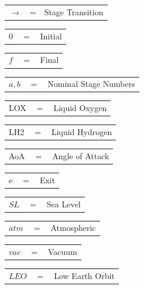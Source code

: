 \begin{tabular}{p{1.2cm}p{1cm}p{5cm}}
	$\rightarrow$ & = & Stage Transition\\
\end{tabular} 
\begin{tabular}{p{1.2cm}p{1cm}p{5cm}}
	$0$ & $=$ & Initial\\
\end{tabular} 
\begin{tabular}{p{1.2cm}p{1cm}p{5cm}}
	$f$ & $=$ & Final\\
\end{tabular} 
\begin{tabular}{p{1.2cm}p{1cm}p{5cm}}
	$a,b$ & $=$ & Nominal Stage Numbers\\
\end{tabular} 
\begin{tabular}{p{1.2cm}p{1cm}p{5cm}}
	LOX & $=$ & Liquid Oxygen\\
\end{tabular} 
\begin{tabular}{p{1.2cm}p{1cm}p{5cm}}
	LH2 & $=$ & Liquid Hydrogen\\
	
\end{tabular} 
\begin{tabular}{p{1.2cm}p{1cm}p{5cm}}
	AoA & $=$ & Angle of Attack\\
	
\end{tabular} 
\begin{tabular}{p{1.2cm}p{1cm}p{5cm}}
	e & $=$ & Exit\\
\end{tabular} 
\begin{tabular}{p{1.2cm}p{1cm}p{5cm}}
	$SL$ & $=$ & Sea Level\\
\end{tabular} 
\begin{tabular}{p{1.2cm}p{1cm}p{5cm}}
	$atm$ & $=$ & Atmospheric\\
	
\end{tabular} 
\begin{tabular}{p{1.2cm}p{1cm}p{5cm}}
	$vac$ & $=$ & Vacuum\\
	
\end{tabular} 
\begin{tabular}{p{1.2cm}p{1cm}p{5cm}}
	$LEO$ & $=$ & Low Earth Orbit\\
	
\end{tabular} 